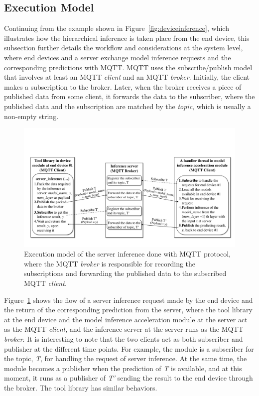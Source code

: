 \documentclass[conference]{IEEEtran}
\def\figurename{Figure}
\begin{document}
\subsection{Execution Model}
\label{sec:execmodel}
Continuing from the example shown in \figurename~\ref{fig:deviceinference}, which illustrates how the hierarchical inference is taken place from the end device, this subsection further details the workflow and considerations at the system level, where end devices and a server exchange model inference requests and the corresponding predictions with MQTT. MQTT uses the subscribe/publish model that involves at least an MQTT \emph{client} and an MQTT \emph{broker}. Initially, the client makes a subscription to the broker. Later, when the broker receives a piece of published data from some client, it forwards the data to the subscriber, where the published data and the subscription are matched by the \emph{topic}, which is usually a non-empty string.

	\begin{figure}[htb!]
        \centering
        \includegraphics[width=1.01\columnwidth]{figure/exe_model}
        \caption{Execution model of the server inference done with MQTT protocol, where the MQTT \emph{broker} is responsible for recording the subscriptions and forwarding the published data to the subscribed MQTT \emph{client}.}
        \label{fig:exemodel} %
    \end{figure}

\figurename~\ref{fig:exemodel} shows the flow of a server inference request made by the end device and the return of the corresponding prediction from the server, where the tool library at the end device and the model inference acceleration module at the server act as the MQTT \emph{client}, and the inference server at the server runs as the MQTT \emph{broker}. It is interesting to note that the two clients act as both subscriber and publisher at the different time points. For example, the module is a subscriber for the topic, \emph{T}, for handling the request of server inference. At the same time, the module becomes a publisher when the prediction of \emph{T} is available, and at this moment, it runs as a publisher of \emph{T'} sending the result to the end device through the broker. The tool library has similar behaviors.
\end{document}
